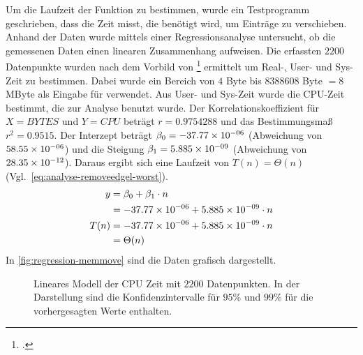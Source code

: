Um die Laufzeit der Funktion  zu bestimmen, wurde ein Testprogramm geschrieben, dass die Zeit misst,
\label{sub:datenstruktur-edgels-memmove}
 die benötigt wird, um Einträge zu verschieben. Anhand der Daten wurde mittels einer Regressionsanalyse untersucht, ob
 die gemessenen Daten einen linearen Zusammenhang aufweisen. Die erfassten $2200$ Datenpunkte wurden nach dem Vorbild
 von \footcite{time-1} ermittelt um Real-, User- und Sys-Zeit zu bestimmen. Dabei wurde ein Bereich von
 $4$ Byte bis $8388608$ Byte $= 8$ MByte als Eingabe für  verwendet. Aus User- und Sys-Zeit wurde
 die CPU-Zeit bestimmt, die zur Analyse benutzt wurde. Der Korrelationskoeffizient für $X = \mathit{BYTES}$ und
 $Y = \mathit{CPU}$ beträgt $r = 0.9754288$ und das Bestimmungsmaß $r^2 = 0.9515$. Der Interzept beträgt
 $\beta_0 = -37.77\times 10^{-06}$ (Abweichung von $58.55\times 10^{-06}$) und die Steigung $\beta_1 = 5.885\times 10^{-09}$
 (Abweichung von $28.35\times 10^{-12}$). Daraus ergibt sich eine Laufzeit von $T(n) =\Theta(n)$
 (Vgl.~\autoref{eq:analyse-removeedgel-worst}).
\begin{equation}
	\label{eq:analyse-removeedgel-worst}
	\begin{split}
		y& = \beta_0 + \beta_1 \cdot n\\
		 & = -37.77\times 10^{-06} + 5.885\times 10^{-09} \cdot n\\
		T(n)& = -37.77\times 10^{-06} + 5.885\times 10^{-09} \cdot n\\
		 & = \Theta(n)
	\end{split}
\end{equation}
In \autoref{fig:regression-memmove} sind die Daten grafisch dargestellt.
\begin{figure}[!ht]
	\centering
	
	\caption{Lineares Modell der CPU Zeit mit $2200$ Datenpunkten. In der Darstellung sind die Konfidenzintervalle für
	 $95\%$ und $99\%$ für die vorhergesagten Werte enthalten.}
	\label{fig:regression-memmove}
\end{figure}

